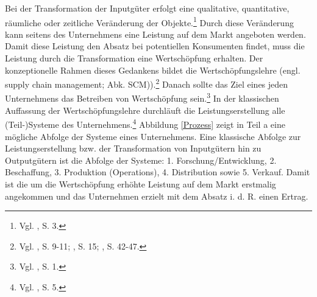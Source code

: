 Bei der Transformation der Inputgüter erfolgt eine qualitative, quantitative, räumliche oder zeitliche Veränderung der Objekte.\footnote{Vgl. \cite{Dyckhoff2010}, S. 3.} Durch diese Veränderung kann seitens des Unternehmens eine Leistung auf dem Markt angeboten werden. Damit diese Leistung den Absatz bei potentiellen Konsumenten findet, muss die Leistung durch die Transformation eine Wertschöpfung erhalten. Der konzeptionelle Rahmen dieses Gedankens bildet die Wertschöpfungslehre (engl. supply chain management; Abk. SCM)).\footnote{Vgl. \cite{Stadtler:2005aa}, S. 9-11; \cite{christopher1998logistics}, S. 15; \cite{oliver1982supply}, S. 42-47.} Danach sollte das Ziel eines jeden Unternehmens das Betreiben von Wertschöpfung sein.\footnote{Vgl. \cite{Bach:2012aa}, S. 1.} In der klassischen Auffassung der Wertschöpfungslehre durchläuft die Leistungserstellung alle (Teil-)Systeme des Unternehmens.\footnote{Vgl. \cite{Werner:2013aa}, S. 5.} Abbildung \ref{Prozess} zeigt in Teil a eine mögliche Abfolge der Systeme eines Unternehmens. Eine klassische Abfolge zur Leistungserstellung bzw. der Transformation von Inputgütern hin zu Outputgütern ist die Abfolge der Systeme: 1. Forschung/Entwicklung, 2. Beschaffung, 3. Produktion (Operations), 4. Distribution sowie 5. Verkauf. Damit ist die um die Wertschöpfung erhöhte Leistung auf dem Markt erstmalig angekommen und das Unternehmen erzielt mit dem Absatz i. d. R. einen Ertrag.

